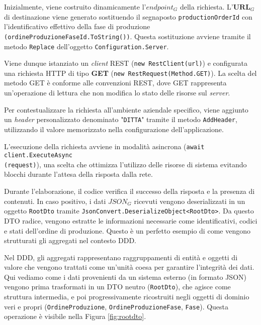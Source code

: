         \vspace{0.2 em}
        \noindent Inizialmente, viene costruito dinamicamente l'\textbf{$endpoint_G$} della richiesta. L'$\textbf{URL}_G$ di destinazione viene generato sostituendo il segnaposto \texttt{productionOrderId} con l'identificativo effettivo della fase di produzione \texttt{(ordineProduzioneFaseId.ToString())}. Questa sostituzione avviene tramite il metodo \texttt{Replace} dell'oggetto \texttt{Configuration.Server}.

        \vspace{0.2 em}
        \noindent Viene dunque istanziato un \textit{client} REST (\texttt{new RestClient(url)}) e configurata una richiesta HTTP di tipo \textbf{GET} (\texttt{new RestRequest(Method.GET)}). La scelta del metodo GET è conforme alle convenzioni REST, dove GET rappresenta un'operazione di lettura che non modifica lo stato delle risorse sul \textit{server}.

        \vspace{0.2 em}
        \noindent Per contestualizzare la richiesta all'ambiente aziendale specifico, viene aggiunto un \textit{header} personalizzato denominato "\texttt{DITTA}" tramite il metodo \texttt{AddHeader}, utilizzando il valore memorizzato nella configurazione dell'applicazione.

        \vspace{0.2 em}
        \noindent L'esecuzione della richiesta avviene in modalità asincrona (\texttt{await client.ExecuteAsync} \\ \texttt{(request)}), una scelta che ottimizza l'utilizzo delle risorse di sistema evitando blocchi durante l'attesa della risposta dalla rete.

        \vspace{0.2 em}
        \noindent Durante l'elaborazione, il codice verifica il successo della risposta e la presenza di contenuti. In caso positivo, i dati \textbf{$JSON_G$} ricevuti vengono deserializzati in un oggetto \texttt{RootDto} tramite \texttt{JsonConvert.DeserializeObject<RootDto>}. Da questo DTO radice, vengono estratte le informazioni necessarie come identificativi, codici e stati dell'ordine di produzione. Questo è un perfetto esempio di come vengono strutturati gli aggregati nel contesto DDD. 

        \vspace{0.2 em}
        \noindent Nel DDD, gli aggregati rappresentano raggruppamenti di entità e oggetti di valore che vengono trattati come un'unità coesa per garantire l'integrità dei dati. Qui vediamo come i dati provenienti da un sistema esterno (in formato JSON) vengono prima trasformati in un DTO neutro (\texttt{RootDto}), che agisce come struttura intermedia, e poi progressivamente ricostruiti negli oggetti di dominio veri e propri (\texttt{OrdineProduzione}, \texttt{OrdineProduzioneFase}, \texttt{Fase}). Questa operazione è visibile nella Figura \ref{fig:rootdto}.

